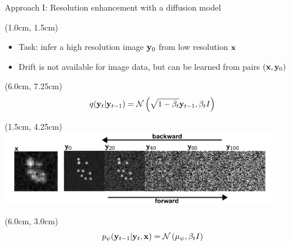 \documentclass{beamer}					%
\begin{document}
\begin{frame}{Approach I: Resolution enhancement with a diffusion model}

\begin{textblock*}{13cm}(1.0cm, 1.5cm)

\begin{itemize}
\item Task: infer a high resolution image $\bold{y}_0$ from low resolution $\bold{x}$
\item Drift is not available for image data, but can be learned from pairs $(\bold{x},\bold{y}_{0})$
\end{itemize}
\end{textblock*}

\begin{textblock*}{2cm}(6.0cm, 7.25cm)
\begin{equation*}
q(\bold{y}_{t}|\bold{y}_{t-1}) = \mathcal{N}\left(\sqrt{1-\beta_{t}}\bold{y}_{t-1},\beta_t I\right)
\end{equation*}
\end{textblock*}

\begin{textblock*}{12cm}(1.5cm, 4.25cm)
\includegraphics[width=12cm]{../../ddpm/ddpm/media/ForwardBackward.png}
\end{textblock*}

\begin{textblock*}{2cm}(6.0cm, 3.0cm)
\begin{equation*}
p_{\psi}(\bold{y}_{t-1}|\bold{y}_{t},\bold{x}) = \mathcal{N}\left(\mu_{\psi},\beta_{t}I\right)
\end{equation*}

\end{textblock*}

\end{frame}
\end{document}
